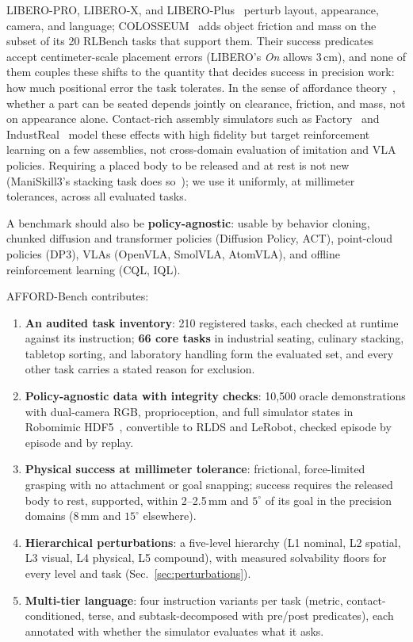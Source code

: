\documentclass[conference]{IEEEtran}
\begin{document}
LIBERO-PRO, LIBERO-X, and LIBERO-Plus~\cite{fei2025liberoplus} perturb layout, appearance, camera, and language; COLOSSEUM~\cite{pumacay2024colosseum} adds object friction and mass on the subset of its 20 RLBench tasks that support them. Their success predicates accept centimeter-scale placement errors (LIBERO's \emph{On} allows 3\,cm), and none of them couples these shifts to the quantity that decides success in precision work: how much positional error the task tolerates. In the sense of affordance theory~\cite{gibson1979ecological}, whether a part can be seated depends jointly on clearance, friction, and mass, not on appearance alone. Contact-rich assembly simulators such as Factory~\cite{narang2022factory} and IndustReal~\cite{tang2023industreal} model these effects with high fidelity but target reinforcement learning on a few assemblies, not cross-domain evaluation of imitation and VLA policies. Requiring a placed body to be released and at rest is not new (ManiSkill3's stacking task does so~\cite{tao2024maniskill3}); we use it uniformly, at millimeter tolerances, across all evaluated tasks.

A benchmark should also be \textbf{policy-agnostic}: usable by behavior cloning, chunked diffusion and transformer policies (Diffusion Policy, ACT), point-cloud policies (DP3), VLAs (OpenVLA, SmolVLA, AtomVLA), and offline reinforcement learning (CQL, IQL).

AFFORD-Bench contributes:
\begin{enumerate}
    \item \textbf{An audited task inventory}: 210 registered tasks, each checked at runtime against its instruction; \textbf{66 core tasks} in industrial seating, culinary stacking, tabletop sorting, and laboratory handling form the evaluated set, and every other task carries a stated reason for exclusion.
    \item \textbf{Policy-agnostic data with integrity checks}: 10{,}500 oracle demonstrations with dual-camera RGB, proprioception, and full simulator states in Robomimic HDF5~\cite{mandlekar2021robomimic}, convertible to RLDS and LeRobot, checked episode by episode and by replay.
    \item \textbf{Physical success at millimeter tolerance}: frictional, force-limited grasping with no attachment or goal snapping; success requires the released body to rest, supported, within 2--2.5\,mm and $5^\circ$ of its goal in the precision domains (8\,mm and $15^\circ$ elsewhere).
    \item \textbf{Hierarchical perturbations}: a five-level hierarchy (L1 nominal, L2 spatial, L3 visual, L4 physical, L5 compound), with measured solvability floors for every level and task (Sec.~\ref{sec:perturbations}).
    \item \textbf{Multi-tier language}: four instruction variants per task (metric, contact-conditioned, terse, and subtask-decomposed with pre/post predicates), each annotated with whether the simulator evaluates what it asks.
\end{enumerate}
\end{document}
